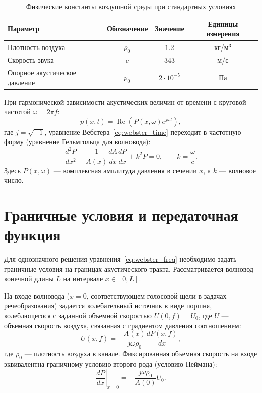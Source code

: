 \begin{table}[H]
    \centering
    \caption{Физические константы воздушной среды при стандартных условиях}
    \label{tab:constants}
    \begin{tabular}{|l|c|c|c|}
        \hline
        Параметр & Обозначение & Значение & Единицы измерения \\
        \hline
        Плотность воздуха & $\rho_0$ & $1.2$ & кг/м$^3$ \\
        Скорость звука & $c$ & $343$ & м/с \\
        Опорное акустическое давление & $p_0$ & $2 \cdot 10^{-5}$ & Па \\
        \hline
    \end{tabular}
\end{table}


При гармонической зависимости акустических величин от времени с круговой частотой $\omega = 2\pi f$:
\begin{equation}
    p(x,t) = \operatorname{Re}\left(P(x,\omega)e^{j\omega t}\right),
\end{equation}
где $j = \sqrt{-1}$, уравнение Вебстера~\eqref{eq:webster_time} переходит в частотную форму (уравнение Гельмгольца для волновода):
\begin{equation}
    \frac{d^2P}{dx^2}
    +
    \frac{1}{A(x)}
    \frac{dA}{dx}
    \frac{dP}{dx}
    +
    k^2 P
    = 0,
    \qquad
    k=\frac{\omega}{c}.
    \label{eq:webster_freq}
\end{equation}
Здесь $P(x,\omega)$ --- комплексная амплитуда давления в сечении $x$, а $k$ --- волновое число.

\section{Граничные условия и передаточная функция}
\label{sec:transfer_function}

Для однозначного решения уравнения~\eqref{eq:webster_freq} необходимо задать граничные условия на границах акустического тракта. Рассматривается волновод конечной длины $L$ на интервале $x \in [0, L]$.

На входе волновода ($x=0$, соответствующем голосовой щели в задачах речеобразования) задается колебательный источник в виде поршня, колеблющегося с заданной объемной скоростью $U(0, f) = U_0$, где $U$ --- объемная скорость воздуха, связанная с градиентом давления соотношением:
\begin{equation}
    U(x, f) = -\frac{A(x)}{j \omega \rho_0} \frac{dP(x, f)}{dx},
\end{equation}
где $\rho_0$ --- плотность воздуха в канале. Фиксированная объемная скорость на входе эквивалентна граничному условию второго рода (условию Неймана):
\begin{equation}
    \left. \frac{dP}{dx} \right|_{x=0} = -\frac{j\omega\rho_0}{A(0)} U_0.
\end{equation}

